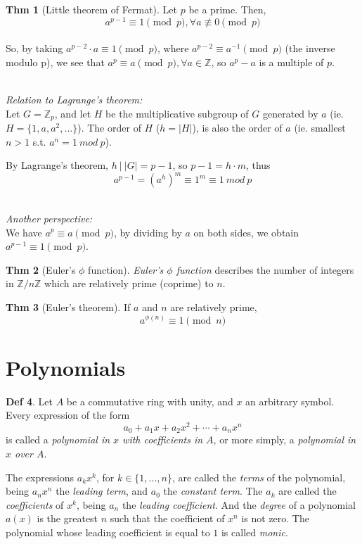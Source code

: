 \documentclass{article}
\theoremstyle{definition}
\newtheorem{definition}{Def}[section]
\newtheorem{theorem}[definition]{Thm}
\begin{document}
\begin{theorem}[Little theorem of Fermat]
    Let $p$ be a prime. Then,
    $$a^{p-1} \equiv 1 \pmod p, \forall a \not\equiv 0 \pmod p$$
    \\
    So, by taking $a^{p-2} \cdot a \equiv 1 \pmod p$, where $a^{p-2} \equiv a^{-1} \pmod p$ (the inverse modulo p), we see that $a^p \equiv a \pmod p, \forall a \in \mathbb{Z}$, so $a^p - a$ is a multiple of $p$.

    ~\\\emph{Relation to Lagrange's theorem:}\\
    Let $G = \mathbb{Z}_p$, and let $H$ be the multiplicative subgroup of $G$ generated by $a$ (ie. $H = \{ 1, a, a^2, \ldots \}$). The order of $H$ ($h = |H|$), is also the order of $a$ (ie. smallest $n>1$ s.t. $a^n=1~mod~p$).

    By Lagrange's theorem, $h~|~|G| = p - 1$, so $p-1 = h \cdot m$, thus
    $$
    a^{p-1} = (a^h)^m \equiv 1^m \equiv 1~mod~p
    $$

    ~\\\emph{Another perspective:}\\
    We have $a^p \equiv a \pmod{p}$, by dividing by $a$ on both sides, we obtain $a^{p-1} \equiv 1 \pmod{p}$.

\end{theorem}

\begin{theorem}[Euler's $\phi$ function]
    \emph{Euler's $\phi$ function} describes the number of integers in $\mathbb{Z} / n \mathbb{Z}$ which are relatively prime (coprime) to $n$.
\end{theorem}

\begin{theorem}[Euler's theorem]
    If $a$ and $n$ are relatively prime, $$a^{\phi(n)} \equiv 1 \pmod n$$
\end{theorem}


\section{Polynomials}

\begin{definition}
    Let $A$ be a commutative ring with unity, and $x$ an arbitrary symbol. Every expression of the form
    $$a_0 + a_1 x + a_2 x^2 + \cdots + a_n x^n$$
    is called a \emph{polynomial in $x$ with coefficients in $A$}, or more simply, a \emph{polynomial in $x$ over $A$}.
\end{definition}
 The expressions $a_k x^k$, for $k \in \{ 1, \ldots, n \}$, are called the \emph{terms} of the polynomial, being $a_n x^n$ the \emph{leading term}, and $a_0$ the \emph{constant term}.
 The $a_k$ are called the \emph{coefficients} of $x^k$, being $a_n$ the \emph{leading coefficient}. And the \emph{degree} of a polynomial $a(x)$ is the greatest $n$ such that the coefficient of $x^n$ is not zero.
 The polynomial whose leading coefficient is equal to $1$ is called \emph{monic}.
\end{document}
